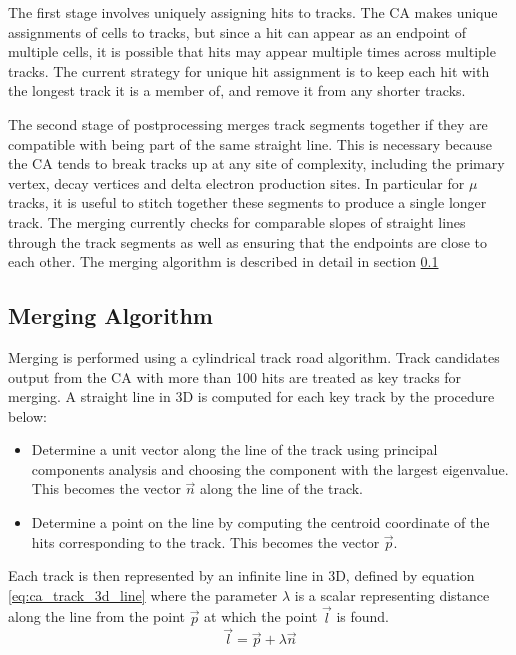The first stage involves uniquely assigning hits to tracks. The \ac{CA} makes unique assignments of cells to tracks, but since a hit can appear as an endpoint of multiple cells, it is possible that hits may appear multiple times across multiple tracks. The current strategy for unique hit assignment is to keep each hit with the longest track it is a member of, and remove it from any shorter tracks.

The second stage of postprocessing merges track segments together if they are compatible with being part of the same straight line. This is necessary because the CA tends to break tracks up at any site of complexity, including the primary vertex, decay vertices and delta electron production sites. In particular for $\mu$ tracks, it is useful to stitch together these segments to produce a single longer track. The merging currently checks for comparable slopes of straight lines through the track segments as well as ensuring that the endpoints are close to each other. The merging algorithm is described in detail in section \ref{sec:cellularautomaton_merging}

\subsection{Merging Algorithm}\label{sec:cellularautomaton_merging}
Merging is performed using a cylindrical track road algorithm. Track candidates output from the CA with more than 100 hits are treated as key tracks for merging. A straight line in 3D is computed for each key track by the procedure below:

\begin{itemize}
	\item Determine a unit vector along the line of the track using principal components analysis and choosing the component with the largest eigenvalue. This becomes the vector $\vec{n}$ along the line of the track.
	\item Determine a point on the line by computing the centroid coordinate of the hits corresponding to the track. This becomes the vector $\vec{p}$.
\end{itemize}

Each track is then represented by an infinite line in 3D, defined by equation \ref{eq:ca_track_3d_line} where the parameter $\lambda$ is a scalar representing distance along the line from the point $\vec{p}$ at which the point $\vec{l}$ is found.
\begin{equation}\label{eq:ca_track_3d_line}
\vec{l} = \vec{p} + \lambda \vec{n}
\end{equation}

